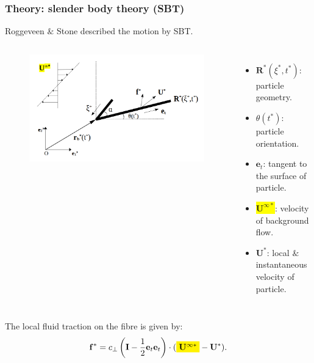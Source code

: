 \documentclass{beamer}
\newcommand{\bi}{\begin{itemize}}
\newcommand{\ei}{\end{itemize}}
\begin{document}


\begin{frame}
	\frametitle{Theory: slender body theory (SBT)}
	\begin{overlayarea}{\textwidth}{\textheight}
		\vspace{-0.5cm}\small Roggeveen $\&$ Stone described the motion by SBT. \normalsize
		\begin{columns}
			\begin{figure}[htb]
				\begin{center}
					\includegraphics[width=1\textwidth]{plots/schematic/schematic_rigid_configuration_color4.png}
				\end{center}
			\end{figure}
			\small \bi 
			\item $\mathbf{R}^*(\xi^*,t^*)$: particle geometry.
			\item $\theta(t^*)$: particle orientation.
			\item $\mathbf{e}_t$: tangent to the surface of particle.
			\item \colorbox{yellow}{$\mathbf{U}^{\infty*}$}: velocity of background flow.
			\item $\mathbf{U}^*$: local $\&$ instantaneous velocity of particle.
			\ei
		\end{columns}\vspace{0.5cm}
	The local fluid traction on the fibre is given by: 
		\begin{equation*}
			\mathbf{f}^*=c_\perp\left(\mathbf{I}-\frac{1}{2}\mathbf{e}_t\mathbf{e}_t\right)\cdot(\colorbox{yellow}{$\mathbf{U}^{\infty*}$}-\mathbf{U}^*).
		\end{equation*}
	\end{overlayarea}
\end{frame}
\end{document}
